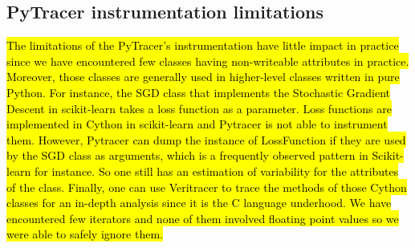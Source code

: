 \documentclass[10pt,journal,compsoc]{IEEEtran}
\newcommand{\pytracer}[0]{PyTracer\xspace}
\DeclareRobustCommand{\add}[1]{\sethlcolor{lightgreen}\hl{#1}}
\DeclareRobustCommand{\add}[1]{#1}
\begin{document}






\subsection{\pytracer instrumentation limitations}

\add{
    The limitations of the PyTracer's instrumentation have little impact in practice
    since we have encountered few classes having non-writeable attributes in practice.
    Moreover, those classes are generally used in higher-level classes written in
    pure Python. For instance, the SGD class that implements the Stochastic Gradient
    Descent in scikit-learn takes a loss function as a parameter. Loss functions are
    implemented in Cython in scikit-learn and Pytracer is not able to instrument
    them. However, Pytracer can dump the instance of LossFunction if they are used
    by the SGD class as arguments, which is a frequently observed pattern in
    Scikit-learn for instance. So one still has an estimation of variability for the
    attributes of the class. Finally, one can use Veritracer to trace the methods of
    those Cython classes for an in-depth analysis since it is the C language
    underhood. We have encountered few iterators and none of them involved floating
    point values so we were able to safely ignore them. 
}
\end{document}
